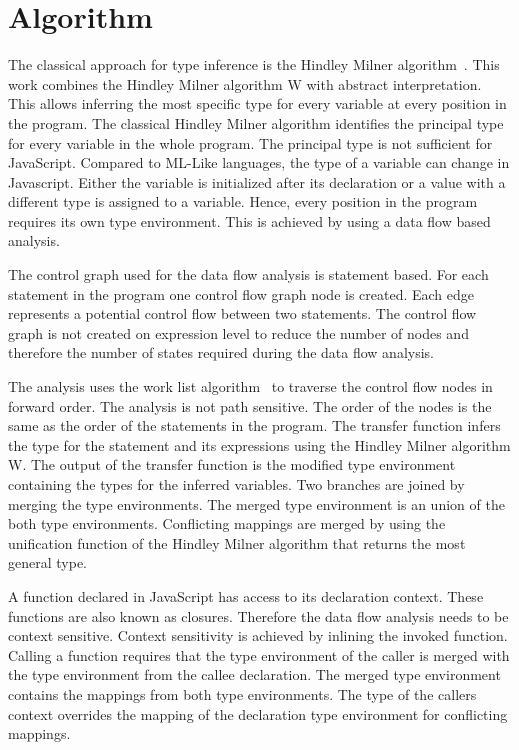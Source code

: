 \section{Algorithm}
The classical approach for type inference is the Hindley Milner algorithm~\cite{Milner1978}. This work combines the Hindley Milner algorithm W with abstract interpretation. This allows inferring the most specific type for every variable at every position in the program. The classical Hindley Milner algorithm identifies the principal type for every variable in the whole program. The principal type is not sufficient for JavaScript. Compared to ML-Like languages, the type of a variable can change in Javascript. Either the variable is initialized after its declaration or a value with a different type is assigned to a variable. Hence, every position in the program requires its own type environment. This is achieved by using a data flow based analysis. 

The control graph used for the data flow analysis is statement based. For each statement in the program one control flow graph node is created. Each edge represents a potential control flow between two statements. The control flow graph is not created on expression level to reduce the number of nodes and therefore the number of states required during the data flow analysis.  

The analysis uses the work list algorithm~\cite{NielsonNielsonHankin1999} to traverse the control flow nodes in forward order. The analysis is not path sensitive. The order of the nodes is the same as the order of the statements in the program. The transfer function infers the type for the statement and its expressions using the Hindley Milner algorithm W. The output of the transfer function is the modified type environment containing the types for the inferred variables. Two branches are joined by merging the type environments. The merged type environment is an union of the both type environments. Conflicting mappings are merged by using the unification function of the Hindley Milner algorithm that returns the most general type.

A function declared in JavaScript has access to its declaration context. These functions are also known as closures. Therefore the data flow analysis needs to be context sensitive. Context sensitivity is achieved by inlining the invoked function. Calling a function requires that the type environment of the caller is merged with the type environment from the callee declaration. The merged type environment contains the mappings from both type environments. The type of the callers context overrides the mapping of the declaration type environment for conflicting mappings. 